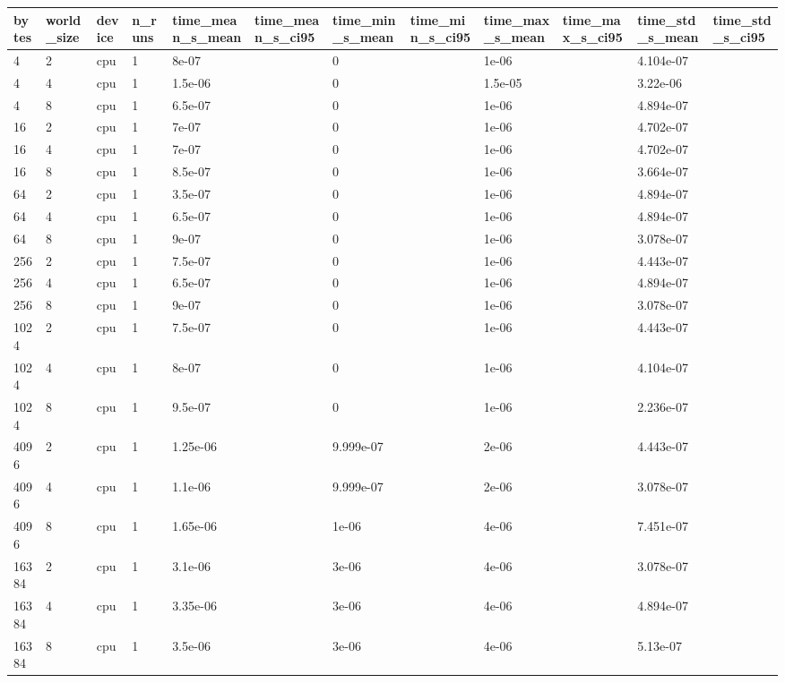 \begin{tabular}{llllllllllll}
\hline
bytes & world\_size & device & n\_runs & time\_mean\_s\_mean & time\_mean\_s\_ci95 & time\_min\_s\_mean & time\_min\_s\_ci95 & time\_max\_s\_mean & time\_max\_s\_ci95 & time\_std\_s\_mean & time\_std\_s\_ci95 \\
\hline
4 & 2 & cpu & 1 & 8e-07 &  & 0 &  & 1e-06 &  & 4.104e-07 &  \\
4 & 4 & cpu & 1 & 1.5e-06 &  & 0 &  & 1.5e-05 &  & 3.22e-06 &  \\
4 & 8 & cpu & 1 & 6.5e-07 &  & 0 &  & 1e-06 &  & 4.894e-07 &  \\
16 & 2 & cpu & 1 & 7e-07 &  & 0 &  & 1e-06 &  & 4.702e-07 &  \\
16 & 4 & cpu & 1 & 7e-07 &  & 0 &  & 1e-06 &  & 4.702e-07 &  \\
16 & 8 & cpu & 1 & 8.5e-07 &  & 0 &  & 1e-06 &  & 3.664e-07 &  \\
64 & 2 & cpu & 1 & 3.5e-07 &  & 0 &  & 1e-06 &  & 4.894e-07 &  \\
64 & 4 & cpu & 1 & 6.5e-07 &  & 0 &  & 1e-06 &  & 4.894e-07 &  \\
64 & 8 & cpu & 1 & 9e-07 &  & 0 &  & 1e-06 &  & 3.078e-07 &  \\
256 & 2 & cpu & 1 & 7.5e-07 &  & 0 &  & 1e-06 &  & 4.443e-07 &  \\
256 & 4 & cpu & 1 & 6.5e-07 &  & 0 &  & 1e-06 &  & 4.894e-07 &  \\
256 & 8 & cpu & 1 & 9e-07 &  & 0 &  & 1e-06 &  & 3.078e-07 &  \\
1024 & 2 & cpu & 1 & 7.5e-07 &  & 0 &  & 1e-06 &  & 4.443e-07 &  \\
1024 & 4 & cpu & 1 & 8e-07 &  & 0 &  & 1e-06 &  & 4.104e-07 &  \\
1024 & 8 & cpu & 1 & 9.5e-07 &  & 0 &  & 1e-06 &  & 2.236e-07 &  \\
4096 & 2 & cpu & 1 & 1.25e-06 &  & 9.999e-07 &  & 2e-06 &  & 4.443e-07 &  \\
4096 & 4 & cpu & 1 & 1.1e-06 &  & 9.999e-07 &  & 2e-06 &  & 3.078e-07 &  \\
4096 & 8 & cpu & 1 & 1.65e-06 &  & 1e-06 &  & 4e-06 &  & 7.451e-07 &  \\
16384 & 2 & cpu & 1 & 3.1e-06 &  & 3e-06 &  & 4e-06 &  & 3.078e-07 &  \\
16384 & 4 & cpu & 1 & 3.35e-06 &  & 3e-06 &  & 4e-06 &  & 4.894e-07 &  \\
16384 & 8 & cpu & 1 & 3.5e-06 &  & 3e-06 &  & 4e-06 &  & 5.13e-07 &  \\

\end{tabular}
